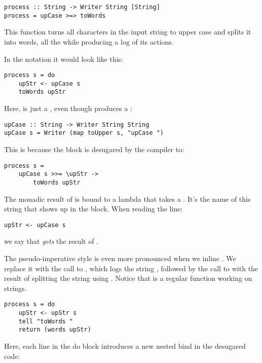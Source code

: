 \begin{Verbatim}[commandchars=\\\{\}]
process :: String -> Writer String [String]
process = upCase >=> toWords
\end{Verbatim}
This function turns all characters in the input string to upper case and
splits it into words, all the while producing a log of its actions.

In the  notation it would look like this:

\begin{Verbatim}[commandchars=\\\{\}]
process s = do 
    upStr <- upCase s
    toWords upStr
\end{Verbatim}
Here,  is just a , even though
 produces a :

\begin{Verbatim}[commandchars=\\\{\}]
upCase :: String -> Writer String String
upCase s = Writer (map toUpper s, "upCase ")
\end{Verbatim}
This is because the  block is desugared by the compiler to:

\begin{Verbatim}
process s = 
    upCase s >>= \upStr ->
        toWords upStr
\end{Verbatim}
The monadic result of  is bound to a lambda that takes a
. It's the name of this string that shows up in the
 block. When reading the line:

\begin{Verbatim}[commandchars=\\\{\}]
upStr <- upCase s
\end{Verbatim}
we say that  \emph{gets} the result of .

The pseudo-imperative style is even more pronounced when we inline
. We replace it with the call to , which
logs the string , followed by the call to
 with the result of splitting the string 
using . Notice that  is a regular function
working on strings.

\begin{Verbatim}[commandchars=\\\{\}]
process s = do
    upStr <- upStr s
    tell "toWords "
    return (words upStr)
\end{Verbatim}
Here, each line in the do block introduces a new nested bind in the
desugared code:


